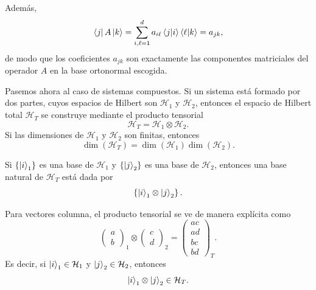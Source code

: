 \documentclass[12pt,a4paper]{article}
\theoremstyle{definition}
\theoremstyle{plain}
\theoremstyle{remark}
\newcommand{\Hil}{\mathcal{H}}
\begin{document}
Además,
\begin{equation*}
    \bra{j}A\ket{k}
    =
    \sum_{i,\ell=1}^{d}
    a_{i\ell}\braket{j|i}\braket{\ell|k}
    =
    a_{jk},
\end{equation*}
de modo que los coeficientes $a_{jk}$ son exactamente las componentes matriciales del operador $A$ en la base ortonormal escogida.

Pasemos ahora al caso de sistemas compuestos. Si un sistema está formado por dos partes, cuyos espacios de Hilbert son $\Hil_1$ y $\Hil_2$, entonces el espacio de Hilbert total $\Hil_T$ se construye mediante el producto tensorial
\begin{equation*}
    \Hil_T=\Hil_1\otimes\Hil_2.
\end{equation*}
Si las dimensiones de $\Hil_1$ y $\Hil_2$ son finitas, entonces
\begin{equation*}
    \dim(\Hil_T)=\dim(\Hil_1)\dim(\Hil_2).
\end{equation*}

Si $\left\{\ket{i}_1\right\}$ es una base de $\Hil_1$ y $\left\{\ket{j}_2\right\}$ es una base de $\Hil_2$, entonces una base natural de $\Hil_T$ está dada por
\begin{equation*}
    \left\{\ket{i}_1\otimes\ket{j}_2\right\}.
\end{equation*}

Para vectores columna, el producto tensorial se ve de manera explícita como
\begin{equation*}
    \begin{pmatrix}
        a\\
        b
    \end{pmatrix}_1
    \otimes
    \begin{pmatrix}
        c\\
        d
    \end{pmatrix}_2
    =
    \begin{pmatrix}
        ac\\
        ad\\
        bc\\
        bd
    \end{pmatrix}_T.
\end{equation*}
Es decir, si $\ket{i}_1\in\Hil_1$ y $\ket{j}_2\in\Hil_2$, entonces
\begin{equation*}
    \ket{i}_1\otimes\ket{j}_2\in\Hil_T.
\end{equation*}
\end{document}
